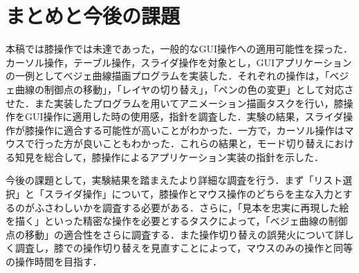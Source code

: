 \documentclass[submit, techrep]{ipsj}
\begin{document}
\section{まとめと今後の課題}
本稿では膝操作では未達であった，一般的なGUI操作への適用可能性を探った．カーソル操作，テーブル操作，スライダ操作を対象とし，GUIアプリケーションの一例としてベジェ曲線描画プログラムを実装した．それぞれの操作は，「ベジェ曲線の制御点の移動」，「レイヤの切り替え」，「ペンの色の変更」として対応させた．また実装したプログラムを用いてアニメーション描画タスクを行い，膝操作をGUI操作に適用した時の使用感，指針を調査した．実験の結果，スライダ操作が膝操作に適合する可能性が高いことがわかった．一方で，カーソル操作はマウスで行った方が良いこともわかった．これらの結果と，モード切り替えにおける知見を総合して，膝操作によるアプリケーション実装の指針を示した．\par
今後の課題として，実験結果を踏まえたより詳細な調査を行う．まず「リスト選択」と「スライダ操作」について，膝操作とマウス操作のどちらを主な入力とするのがふさわしいかを調査する必要がある．さらに，「見本を忠実に再現した絵を描く」といった精密な操作を必要とするタスクによって，「ベジェ曲線の制御点の移動」の適合性をさらに調査する．また操作切り替えの誤発火について詳しく調査し，膝での操作切り替えを見直すことによって，マウスのみの操作と同等の操作時間を目指す．
\par

%
%
%




\begin{biography}

\end{biography}
\end{document}
